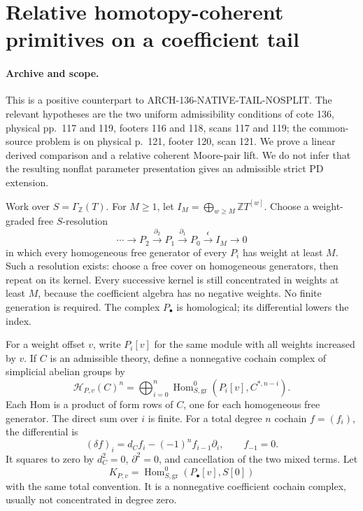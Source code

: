 \section{Relative homotopy-coherent primitives on a coefficient tail}
\label{sec:136-derived-tail-primitives}

\paragraph{Archive and scope.}
This is a positive counterpart to ARCH-136-NATIVE-TAIL-NOSPLIT.
The relevant hypotheses are the two uniform admissibility conditions
of cote 136, physical pp.~117 and 119, footers 116 and 118,
scans 117 and 119; the common-source problem is on physical p.~121,
footer 120, scan 121. We prove a linear derived comparison and a
relative coherent Moore-pair lift. We do not infer that the resulting
nonflat parameter presentation gives an admissible strict PD extension.

Work over \(S=\Gamma_{\mathbb Z}(T)\). For \(M\geq1\), let
\(I_M=\bigoplus_{w\geq M}\mathbb ZT^{[w]}\).
Choose a weight-graded free \(S\)-resolution
\[
 \cdots\longrightarrow P_2\xrightarrow{\partial_2}P_1
       \xrightarrow{\partial_1}P_0
       \xrightarrow{\epsilon}I_M\longrightarrow0
                                                        \tag{136.DT1}
\]
in which every homogeneous free generator of every \(P_i\)
has weight at least \(M\). Such a resolution exists: choose
a free cover on homogeneous generators, then repeat on its
kernel. Every successive kernel is still concentrated in weights
at least \(M\), because the coefficient algebra has no negative
weights. No finite generation is required.
The complex \(P_\bullet\) is homological; its differential
lowers the index.

For a weight offset \(v\), write \(P_i[v]\) for the same
module with all weights increased by \(v\). If \(C\) is an
admissible theory, define a nonnegative cochain complex of
simplicial abelian groups by
\[
 \mathcal H_{P,v}(C)^n
       =\bigoplus_{i=0}^{n}
          \operatorname{Hom}^{0}_{S,\mathrm{gr}}
                  (P_i[v],C^{*,n-i}).                  \tag{136.DT2}
\]
Each Hom is a product of form rows of \(C\), one for each
homogeneous free generator. The direct sum over \(i\) is finite.
For a total degree \(n\) cochain \(f=(f_i)\), the differential is
\[
 (\delta f)_i=d_Cf_i-(-1)^n f_{i-1}\partial_i,
                 \qquad f_{-1}=0.                     \tag{136.DT3}
\]
It squares to zero by \(d_C^2=0\), \(\partial^2=0\), and
cancellation of the two mixed terms.
Let
\[
 K_{P,v}=\operatorname{Hom}^{0}_{S,\mathrm{gr}}
                         (P_\bullet[v],S[0])           \tag{136.DT4}
\]
with the same total convention. It is a nonnegative coefficient
cochain complex, usually not concentrated in degree zero.

